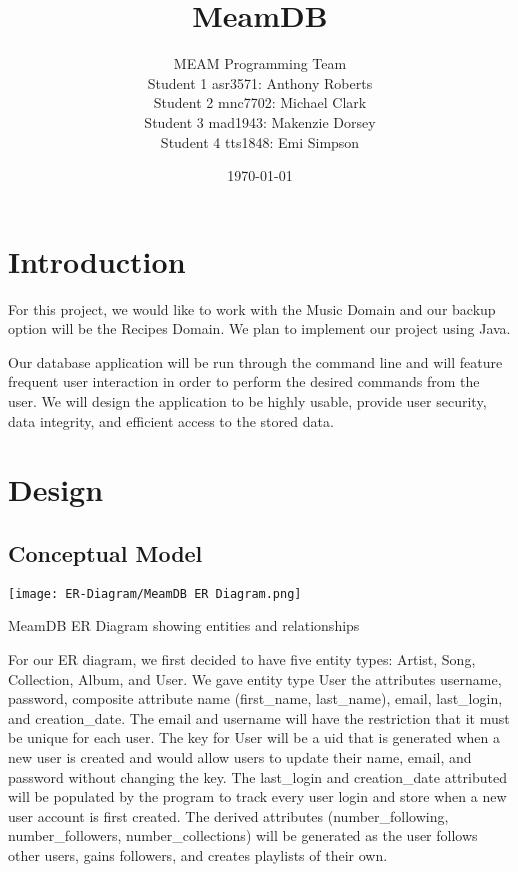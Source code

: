 \documentclass[12pt]{article}
\title{MeamDB}
\date{\today}
\author{MEAM Programming Team \\
Student 1 asr3571: Anthony Roberts\\
Student 2 mnc7702: Michael Clark\\
Student 3 mad1943: Makenzie Dorsey\\
Student 4 tts1848: Emi Simpson\\
}
\begin{document}
    \maketitle

    \section{Introduction}
    For this project, we would like to work with the Music Domain
    and our backup option will be the Recipes Domain. We plan to
    implement our project using Java.

    \vspace{0.5cm}

    \noindent Our database application will be run through the command line
    and will feature frequent user interaction in order to perform the desired
    commands from the user. We will design the application to be highly usable,
    provide user security, data integrity, and efficient access to the stored data.

    \section{Design}
    \subsection{Conceptual Model}

    \vspace{0.5cm}


    \begin{center}
    \texttt{[image: ER-Diagram/MeamDB ER Diagram.png]}
    \end{center}
    \caption{MeamDB ER Diagram showing entities and relationships}
    \label{ER Diagram}

    \vspace{0.5cm}

    \noindent For our ER diagram, we first decided to have five entity types:
    Artist, Song, Collection, Album, and User. We gave entity type User the attributes
    username, password, composite attribute name (first\_name, last\_name), email,
    last\_login, and creation\_date. The email and username will have the restriction that it must be unique
    for each user. The key for User will be a uid that is generated when a new user is
    created and would allow users to update their name, email, and password without
    changing the key. The last\_login and creation\_date attributed will be populated by the program
    to track every user login and store when a new user account is first created. The derived attributes
    (number\_following, number\_followers, number\_collections) will be generated as the user
    follows other users, gains followers, and creates playlists of their own.
\end{document}

